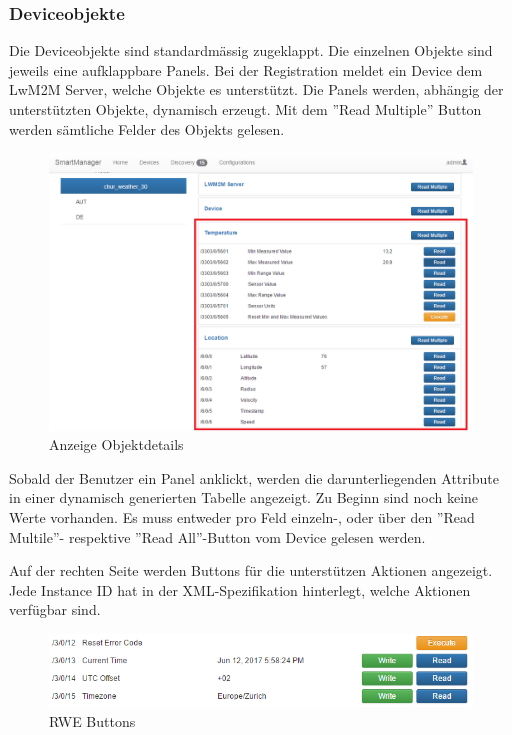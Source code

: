 \subsubsection{Deviceobjekte}
Die Deviceobjekte sind standardmässig zugeklappt. Die einzelnen Objekte sind jeweils eine aufklappbare Panels. Bei der Registration meldet ein Device dem LwM2M Server, welche Objekte es unterstützt. Die Panels werden, abhängig der unterstützten Objekte, dynamisch erzeugt. Mit dem ''Read Multiple'' Button werden sämtliche Felder des Objekts gelesen.

\begin{figure}[H]
\centering
\includegraphics[scale=0.57]{../04_Realisierung/images/userinterface/devicefragment.png}
\caption{Anzeige Objektdetails}
\end{figure}

Sobald der Benutzer ein Panel anklickt, werden die darunterliegenden Attribute in einer dynamisch generierten Tabelle angezeigt. Zu Beginn sind noch keine Werte vorhanden. Es muss entweder pro Feld einzeln-, oder über den ''Read Multile''- respektive ''Read All''-Button vom Device gelesen werden.

Auf der rechten Seite werden Buttons für die unterstützen Aktionen angezeigt. Jede Instance ID hat in der XML-Spezifikation hinterlegt, welche Aktionen verfügbar sind.

\begin{figure}[H]
\centering
\includegraphics[scale=0.7]{../04_Realisierung/images/userinterface/rwe.png}
\caption{RWE Buttons}
\end{figure}
\newpage

